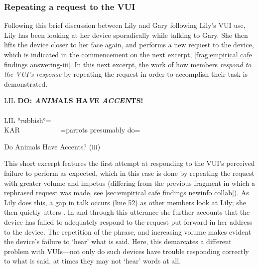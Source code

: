 \crpagebreak\subsubsection{Repeating a request to the VUI}\label{sec:empirical cafe findings answering repeating}
\begin{revisedsubmission}
Following this brief discussion between Lily and Gary following Lily's \ac{VUI} use, Lily has been looking at her device sporadically while talking to Gary.
She then lifts the device closer to her face again, and performs a new request to the device, which is indicated in the commencement on the next excerpt, \autoref{frag:empirical cafe findings answering-iii}.
In this next excerpt, the work of how members \textit{respond to the \ac{VUI}'s response} by repeating the request in order to accomplish their task is demonstrated. %

\begin{inlinefrag}
    {
    \begin{transcript}[51]
        \by LIL {\textbf{DO: \emph{ANIM}ALS HA\emph{V}E \emph{ACCEN}TS!}} \\
         \\
        \by LIL {°rubbish°=} \\
        \by KAR {~~~~~~~~~~~=parrots presumably do=} \\
    \end{transcript}
    \caption{Do Animals Have Accents? (iii)}\label{frag:empirical cafe findings answering-iii}
    }
\end{inlinefrag}

This short excerpt features the first attempt at responding to the \ac{VUI}'s perceived failure to perform as expected, which in this case is done by repeating the request with greater volume and impetus (differing from the previous fragment in which a rephrased request was made, see \ref{sec:empirical cafe findings newinfo collab}).
As Lily does this, a gap in talk occurs (line 52) as other members look at Lily; she then quietly utters .
In and through this utterance she further accounts that the device has failed to adequately respond to the request put forward in her address to the device.
The repetition of the phrase, and increasing volume makes evident the device's failure to `hear' what is said.
Here, this demarcates a different problem with \acp{VUI}---not only do such devices have trouble responding correctly to what is said, at times they may not `hear' words at all.
\end{revisedsubmission}



